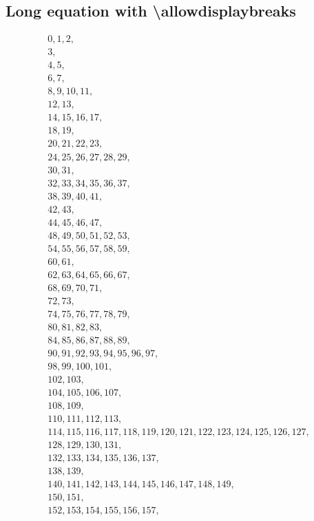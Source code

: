 \documentclass{ltxdoc}
\begin{document}
\subsection*{Long equation with \textbackslash allowdisplaybreaks}

\nextlipsum
\begin{multline}
0, 1, 2, \\
3, \\
4, 5, \\
6, 7, \\
8, 9, 10, 11, \\
12, 13, \\
14, 15, 16, 17, \\
18, 19, \\
20, 21, 22, 23, \\
24, 25, 26, 27, 28, 29, \\
30, 31, \\
32, 33, 34, 35, 36, 37, \\
38, 39, 40, 41, \\
42, 43, \\
44, 45, 46, 47, \\
48, 49, 50, 51, 52, 53, \\
54, 55, 56, 57, 58, 59, \\
60, 61, \\
62, 63, 64, 65, 66, 67, \\
68, 69, 70, 71, \\
72, 73, \\
74, 75, 76, 77, 78, 79, \\
80, 81, 82, 83, \\
84, 85, 86, 87, 88, 89, \\
90, 91, 92, 93, 94, 95, 96, 97, \\
98, 99, 100, 101, \\
102, 103, \\
104, 105, 106, 107, \\
108, 109, \\
110, 111, 112, 113, \\
114, 115, 116, 117, 118, 119, 120, 121, 122, 123, 124, 125, 126, 127, \\
128, 129, 130, 131, \\
132, 133, 134, 135, 136, 137, \\
138, 139, \\
140, 141, 142, 143, 144, 145, 146, 147, 148, 149, \\
150, 151, \\
152, 153, 154, 155, 156, 157, \\

\end{multline}
\end{document}
